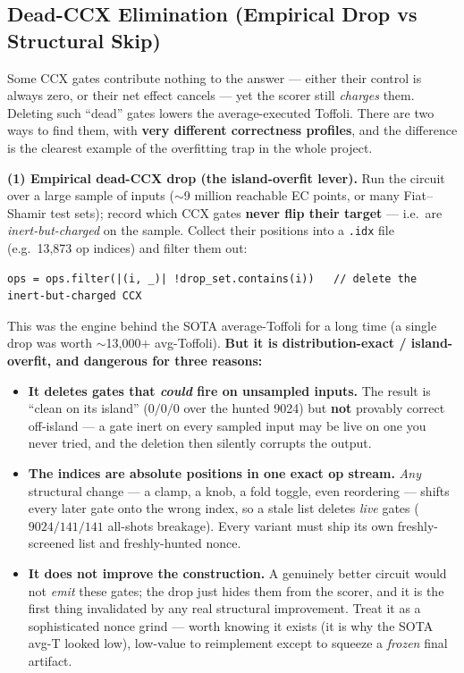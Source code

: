 \documentclass[11pt,a4paper]{article}
\begin{document}
\subsection{Dead-CCX Elimination (Empirical Drop vs Structural Skip)}
\label{sec:deadccx}

Some CCX gates contribute nothing to the answer --- either their control is always zero, or their net
effect cancels --- yet the scorer still \emph{charges} them. Deleting such ``dead'' gates lowers the
average-executed Toffoli. There are two ways to find them, with \textbf{very different correctness
profiles}, and the difference is the clearest example of the overfitting trap in the whole project.

\textbf{(1) Empirical dead-CCX drop (the island-overfit lever).} Run the circuit over a large sample
of inputs ($\sim$9 million reachable EC points, or many Fiat--Shamir test sets); record which CCX
gates \textbf{never flip their target} --- i.e.\ are \emph{inert-but-charged} on the sample. Collect
their positions into a \texttt{.idx} file (e.g.\ 13{,}873 op indices) and filter them out:

\begin{lstlisting}
ops = ops.filter(|(i, _)| !drop_set.contains(i))   // delete the inert-but-charged CCX
\end{lstlisting}

This was the engine behind the SOTA average-Toffoli for a long time (a single drop was worth
$\sim$13{,}000$+$ avg-Toffoli). \textbf{But it is distribution-exact / island-overfit, and dangerous
for three reasons:}
\begin{itemize}
  \item \textbf{It deletes gates that \emph{could} fire on unsampled inputs.} The result is ``clean
    on its island'' ($0/0/0$ over the hunted 9024) but \textbf{not} provably correct off-island ---
    a gate inert on every sampled input may be live on one you never tried, and the deletion then
    silently corrupts the output.
  \item \textbf{The indices are absolute positions in one exact op stream.} \emph{Any} structural
    change --- a clamp, a knob, a fold toggle, even reordering --- shifts every later gate onto the
    wrong index, so a stale list deletes \emph{live} gates ($9024/141/141$ all-shots breakage). Every
    variant must ship its own freshly-screened list and freshly-hunted nonce.
  \item \textbf{It does not improve the construction.} A genuinely better circuit would not
    \emph{emit} these gates; the drop just hides them from the scorer, and it is the first thing
    invalidated by any real structural improvement. Treat it as a sophisticated nonce grind --- worth
    knowing it exists (it is why the SOTA avg-T looked low), low-value to reimplement except to
    squeeze a \emph{frozen} final artifact.
\end{itemize}
\end{document}
